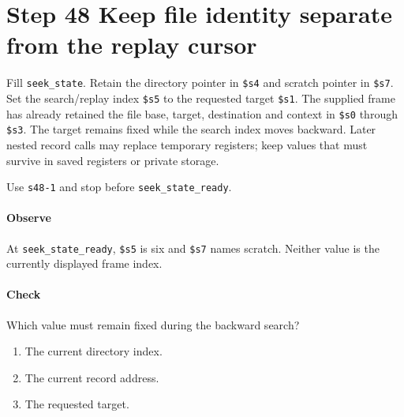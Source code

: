 \section{Step 48 Keep file identity separate from the replay cursor}
Fill \texttt{seek\_state}. Retain the directory pointer in \texttt{\$s4} and scratch pointer in \texttt{\$s7}. Set the search/replay index \texttt{\$s5} to the requested target \texttt{\$s1}. The supplied frame has already retained the file base, target, destination and context in \texttt{\$s0} through \texttt{\$s3}. The target remains fixed while the search index moves backward. Later nested record calls may replace temporary registers; keep values that must survive in saved registers or private storage.

Use \texttt{s48-1} and stop before \texttt{seek\_state\_ready}.

\paragraph{Observe} At \texttt{seek\_state\_ready}, \texttt{\$s5} is six and \texttt{\$s7} names scratch. Neither value is the currently displayed frame index.

\paragraph{Check} Which value must remain fixed during the backward search?
\begin{enumerate}[label=\Alph*.]
\item The current directory index.
\item The current record address.
\item The requested target.
\end{enumerate}
